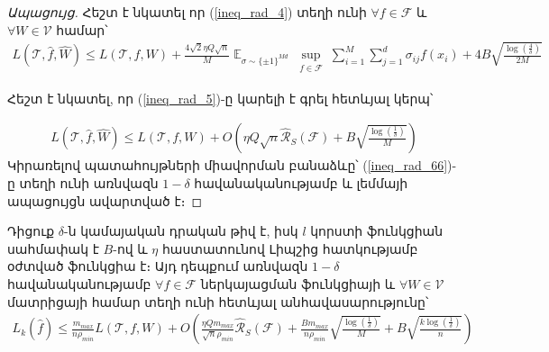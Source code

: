\documentclass[12pt]{article}
\DeclareMathOperator*{\E}{\mathbb{E}}
\begin{document}
\begin{proof}[Ապացույց]
\noindent Հեշտ է նկատել որ (\ref{ineq_rad_4}) տեղի ունի  $\forall f \in \mathcal{ F}$ և $\forall W \in \mathcal{V}$ համար՝
\begin{align}
\label{ineq_rad_5}
L(\mathcal{T}, \hat{f}, \hat{W}) \leq  L(\mathcal{T}, f, W) + \frac{4\sqrt{2} \eta Q\sqrt{n}}{M} \E_{\sigma \sim \{\pm1\}^{Md}} \sup_{\substack{ f  \in \mathcal{F}  }}\sum_{i=1}^M \sum_{j=1}^d \sigma_{ij}f(x_i)+    4B\sqrt{\frac{\log \left( \frac{4}{\delta} \right)}{2M}}
\end{align}

 Հեշտ է նկատել, որ (\ref{ineq_rad_5})-ը կարելի է գրել հետևյալ կերպ՝

\begin{align}
\label{ineq_rad_66}
L(\mathcal{T}, \hat{f}, \hat{W}) \leq  L(\mathcal{T}, f, W) + O\left( \eta Q\sqrt{n} \hat{\mathcal{R}}_S(\mathcal{F})+    B\sqrt{\frac{\log \left( \frac{1}{\delta} \right)}{M}} \right)
\end{align}
Կիրառելով պատահույթների միավորման բանաձևը՝ (\ref{ineq_rad_66})-ը տեղի ունի առնվազն $1-\delta$ հավանականությամբ և լեմմայի ապացույցն ավարտված է։
\end{proof}



\begin{theorem}
\label{main_theorem}
Դիցուք $\delta$-ն կամայական դրական թիվ է,  իսկ $l$ կորստի ֆունկցիան սահմափակ է $B$-ով և $\eta$ հաստատունով Լիպշից հատկությամբ օժտված ֆունկցիա է։ Այդ դեպքում առնվազն $1-\delta$ հավանականությամբ $\forall f \in \mathcal{F}$ ներկայացման ֆունկցիայի և $\forall W \in \mathcal{V}$ մատրիցայի համար տեղի ունի հետևյալ անհավասարությունը՝ 
\begin{align*}
L_k(\hat{f}) \leq  \frac{m_{max}}{n \rho_{min}}  L(\mathcal{T}, f, W)+ O\left(
\frac{\eta Qm_{max}}{\sqrt{n}\rho_{min}} \hat{\mathcal{R}}_S(\mathcal{F})+    \frac{Bm_{max}}{n\rho_{min}}\sqrt{\frac{\log \left( \frac{1}{\delta} \right)}{M}} + B\sqrt{\frac{k\log \left(\frac{1}{\delta}\right) }{n}} \right)
\end{align*}
\end{theorem}
\end{document}
